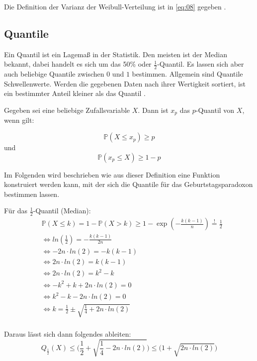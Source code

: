 \documentclass[../main.tex]{subfiles}
\begin{document}
\begin{flushleft}
Die Definition der Varianz der Weibull-Verteilung ist in \ref{eq:08} gegeben \cite{rinne}.

 \subsection{Quantile}

Ein Quantil ist ein Lagemaß in der Statistik. Den meisten ist der Median bekannt, dabei handelt es sich um das 50\% oder $\frac{1}{2}$-Quantil. Es lassen sich aber auch beliebige Quantile zwischen $0$ und $1$ bestimmen. Allgemein sind Quantile Schwellenwerte. Werden die gegebenen Daten nach ihrer Wertigkeit sortiert, ist ein bestimmter Anteil kleiner als das Quantil \cite[32,35,37]{henze}. \newline

Gegeben sei eine beliebige Zufallsvariable $X$. Dann ist $x_{p}$ das $p$-Quantil von $X$, wenn gilt:

\begin{equation}
\mathbb{P}(X \leq x_p) \geq p
\end{equation}
und
\begin{equation}
\mathbb{P}( x_p \leq X ) \geq 1- p
\end{equation}

Im Folgenden wird beschrieben wie aus dieser Definition eine Funktion konstruiert werden kann, mit der sich die Quantile für das Geburtstagsparadoxon bestimmen lassen. \newline

Für das  $\frac{1}{2}$-Quantil (Median):
\begin{align*}
& \mathbb{P}(X \leq k) = 1 - \mathbb{P}(X > k) \geq 1 - \exp(-\frac{ k(k-1) }{ n }) \overset{!}{=} \frac{ 1 }{ 2 } \\
& \Leftrightarrow ln(\frac{ 1 }{ 2 }) = -\frac{ k(k-1)}{ 2n } \\
& \Leftrightarrow -2n\cdot ln(2) = -k(k-1) \\
& \Leftrightarrow 2n\cdot ln(2) = k(k-1) \\
& \Leftrightarrow 2n\cdot ln(2) = k^{2} - k \\
& \Leftrightarrow - k^{2} + k + 2n\cdot ln(2) = 0 \\
& \Leftrightarrow k^{2} - k - 2n\cdot ln(2) = 0 \\
& \Leftrightarrow k = \frac{ 1 }{ 2 } \pm \sqrt{ \frac{ 1 }{ 4 } + 2n\cdot ln(2)} \\
\end{align*}

Daraus lässt sich dann folgendes ableiten:
\begin{equation}
Q_{ \frac{ 1 }{ 2 } }(X) \leq \bigg( \frac{ 1 }{ 2 } + \sqrt{ \frac{ 1 }{ 4 } - 2n\cdot ln(2)} \bigg) \leq \bigg(1+\sqrt{ 2n\cdot ln(2) }\bigg)
\end{equation}
\newline


\end{flushleft}
\end{document}
